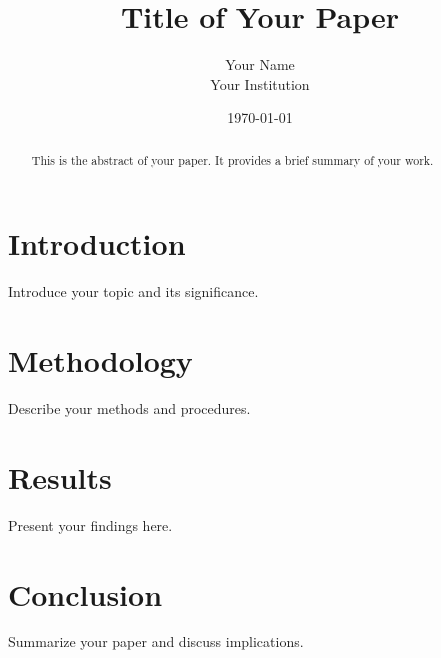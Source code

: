 \documentclass[a4paper,12pt]{article}
\title{Title of Your Paper}
\author{Your Name \\
        Your Institution}
\date{\today}
\begin{document}
\maketitle

\begin{abstract}
This is the abstract of your paper. It provides a brief summary of your work.
\end{abstract}

\section{Introduction}
Introduce your topic and its significance.

\section{Methodology}
Describe your methods and procedures.

\section{Results}
Present your findings here.

\section{Conclusion}
Summarize your paper and discuss implications.
\end{document}
